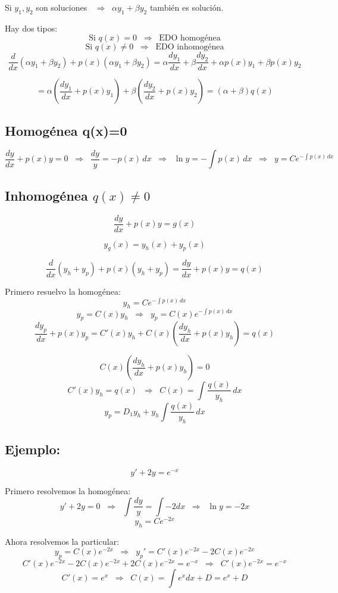 \documentclass[a4paper,12pt]{article}
\begin{document}
Si $y_1,y_2$ son soluciones $\;\;\Rightarrow\;\;\alpha y_1+\beta y_2$ también es solución.

\medskip
\newpage
Hay dos tipos:
\[
\text{Si } q(x)=0 \;\;\Rightarrow\;\; \text{EDO homogénea}
\]
\[
\text{Si } q(x)\neq 0 \;\;\Rightarrow\;\; \text{EDO inhomogénea}
\]
\[
\frac{d}{dx}(\alpha y_1 + \beta y_2) + p(x)(\alpha y_1 + \beta y_2) 
= \alpha \frac{dy_1}{dx} + \beta \frac{dy_2}{dx} + \alpha p(x)y_1 + \beta p(x)y_2
\]

\[
= \alpha\left(\frac{dy_1}{dx}+p(x)y_1\right)+\beta\left(\frac{dy_2}{dx}+p(x)y_2\right)
= (\alpha+\beta)q(x)
\]

\subsection{Homogénea q(x)=0}

\[
\frac{dy}{dx}+p(x)y=0
\;\;\Rightarrow\;\;
\frac{dy}{y}=-p(x)\,dx
\;\;\Rightarrow\;\;
\ln y = -\int p(x)\,dx
\;\;\Rightarrow\;\;
y=Ce^{-\int p(x)\,dx}
\]
\subsection{Inhomogénea $q(x)\neq 0$}
\[
\frac{dy}{dx}+p(x)y=g(x)
\]

\[
y_g(x)=y_h(x)+y_p(x)
\]

\[
\frac{d}{dx}(y_h+y_p)+p(x)(y_h+y_p)=\frac{dy}{dx}+p(x)y=q(x)
\]

Primero resuelvo la homogénea:
\[
y_h = C e^{-\int p(x)\,dx}
\]
\[
y_p = C(x)y_h \;\;\Rightarrow\;\; y_p = C(x)e^{-\int p(x)\,dx}
\]
\[
\frac{dy_p}{dx}+p(x)y_p = C'(x)y_h + C(x)\left(\frac{dy_h}{dx}+p(x)y_h\right)=q(x)
\]

\[
C(x)\left(\frac{dy_h}{dx}+p(x)y_h\right)=0
\]
\[
C'(x)y_h=q(x)
\;\;\Rightarrow\;\;
C(x)=\int \frac{q(x)}{y_h}\,dx
\]
\[
y_p = D_1 y_h + y_h \int \frac{q(x)}{y_h}\,dx
\]
\subsection*{Ejemplo:}

\[
y' + 2y = e^{-x}
\]

Primero resolvemos la homogénea:
\[
y' + 2y = 0 \;\;\Rightarrow\;\; \int \frac{dy}{y} = \int -2dx 
\;\;\Rightarrow\;\; \ln y = -2x
\]
\[
y_h = Ce^{-2x}
\]

Ahora resolvemos la particular:
\[
y_p = C(x)e^{-2x} \;\;\Rightarrow\;\; 
y_p' = C'(x)e^{-2x} - 2C(x)e^{-2x}
\]
\[
C'(x)e^{-2x} - 2C(x)e^{-2x} + 2C(x)e^{-2x} = e^{-x} 
\;\;\Rightarrow\;\; C'(x)e^{-2x} = e^{-x}
\]
\[
C'(x) = e^x \;\;\Rightarrow\;\; C(x) = \int e^x dx + D = e^x + D
\]
\end{document}
